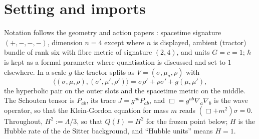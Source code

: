 \documentclass[11pt]{article}
\theoremstyle{definition}
\theoremstyle{plain}
\providecommand{\ip}{}\renewcommand{\ip}[2]{\langle #1, #2\rangle}
\begin{document}
\section{Setting and imports}

\label{c:note.mass.setting-setting-imports}
Notation follows the geometry and action papers \cite{ButlerT6, ButlerT10}: spacetime signature $(+,-,-,-)$, dimension $n = 4$ except where $n$ is displayed, ambient (tractor) bundle of rank six with fibre metric of signature $(2,4)$, and units $G = c = 1$; $\hbar$ is kept as a formal parameter where quantisation is discussed and set to $1$ elsewhere. In a scale $g$ the tractor splits as $V = (\sigma, \mu_{a}, \rho)$ with
\begin{equation}
\ip{(\sigma,\mu,\rho)}{(\sigma',\mu',\rho')} = \sigma\rho' + \rho\sigma' + g(\mu,\mu'),
\end{equation}
the hyperbolic pair on the outer slots and the spacetime metric on the middle. The Schouten tensor is $P_{ab}$, its trace $J = g^{ab}P_{ab}$, and $\Box = g^{ab}\nabla_{a}\nabla_{b}$ is the wave operator, so that the Klein-Gordon equation for mass $m$ reads $(\Box + m^{2})\sigma = 0$. Throughout, $H^{2} := \Lambda/3$, so that $Q(I) = H^{2}$ for the frozen point below; $H$ is the Hubble rate of the de Sitter background, and ``Hubble units'' means $H = 1$.
\end{document}
